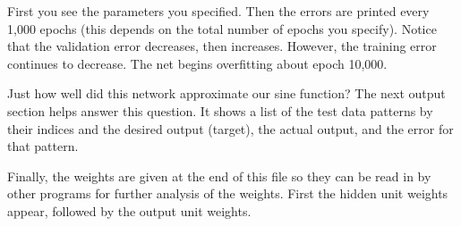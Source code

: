 First you see the parameters you specified.  Then the errors are printed every
1,000 epochs (this depends on the total number of epochs you specify).  Notice
that the validation error decreases, then increases.  However, the training
error continues to decrease.  The net begins overfitting about epoch 10,000.

Just how well did this network approximate our sine function?  The
next output section helps answer this question.  It shows a list of
the test data patterns by their indices and the desired output (target), the
actual output, and the error for that pattern.  

Finally, the weights are given at the end of this file so they can be read
in by other programs for further analysis of the weights.  First the hidden
unit weights appear, followed by the output unit weights.

